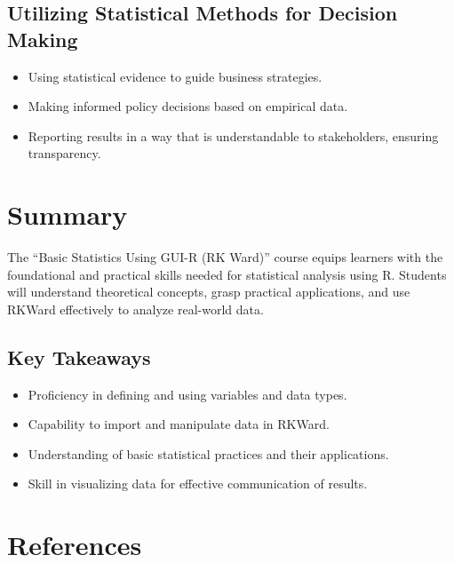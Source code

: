 \documentclass[
  letterpaper,
  DIV=11,
  numbers=noendperiod]{scrreprt}
\providecommand{\tightlist}{%
  \setlength{\itemsep}{0pt}\setlength{\parskip}{0pt}}
\begin{document}
\section{Utilizing Statistical Methods for Decision
Making}\label{utilizing-statistical-methods-for-decision-making}

\begin{itemize}
\tightlist
\item
  Using statistical evidence to guide business strategies.
\item
  Making informed policy decisions based on empirical data.
\item
  Reporting results in a way that is understandable to stakeholders,
  ensuring transparency.
\end{itemize}


\chapter{Summary}\label{summary}

The ``Basic Statistics Using GUI-R (RK Ward)'' course equips learners
with the foundational and practical skills needed for statistical
analysis using R. Students will understand theoretical concepts, grasp
practical applications, and use RKWard effectively to analyze real-world
data.

\section{Key Takeaways}\label{key-takeaways}

\begin{itemize}
\tightlist
\item
  Proficiency in defining and using variables and data types.
\item
  Capability to import and manipulate data in RKWard.
\item
  Understanding of basic statistical practices and their applications.
\item
  Skill in visualizing data for effective communication of results.
\end{itemize}


\chapter{References}\label{references-1}
\end{document}
